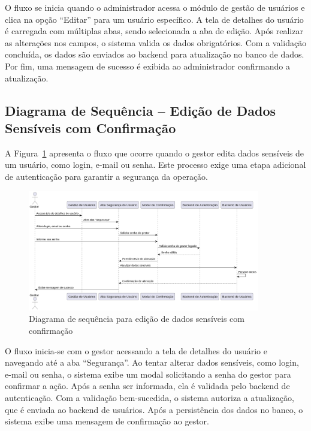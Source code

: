O fluxo se inicia quando o administrador acessa o módulo de gestão de usuários e clica na opção “Editar” para um usuário específico. A tela de detalhes do usuário é carregada com múltiplas abas, sendo selecionada a aba de edição. Após realizar as alterações nos campos, o sistema valida os dados obrigatórios. Com a validação concluída, os dados são enviados ao backend para atualização no banco de dados. Por fim, uma mensagem de sucesso é exibida ao administrador confirmando a atualização.

\subsection{Diagrama de Sequência – Edição de Dados Sensíveis com Confirmação}

A Figura~\ref{fig:diagrama-dados-sensiveis} apresenta o fluxo que ocorre quando o gestor edita dados sensíveis de um usuário, como login, e-mail ou senha. Este processo exige uma etapa adicional de autenticação para garantir a segurança da operação.

\begin{figure}[H]
    \centering
    \includegraphics[width=0.9\textwidth]{images/diagramasdesequencias/userCredentials.png}
    \caption{Diagrama de sequência para edição de dados sensíveis com confirmação}
    \label{fig:diagrama-dados-sensiveis}
\end{figure}

O fluxo inicia-se com o gestor acessando a tela de detalhes do usuário e navegando até a aba “Segurança”. Ao tentar alterar dados sensíveis, como login, e-mail ou senha, o sistema exibe um modal solicitando a senha do gestor para confirmar a ação. Após a senha ser informada, ela é validada pelo backend de autenticação. Com a validação bem-sucedida, o sistema autoriza a atualização, que é enviada ao backend de usuários. Após a persistência dos dados no banco, o sistema exibe uma mensagem de confirmação ao gestor.

